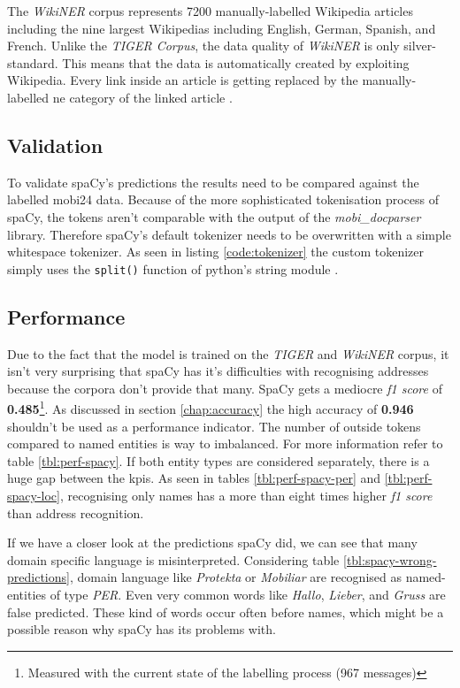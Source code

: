 The \emph{WikiNER} corpus represents 7200 manually-labelled Wikipedia articles including the nine largest Wikipedias including English, German, Spanish,
and French. Unlike the \emph{TIGER Corpus}, the data quality of \emph{WikiNER} is only silver-standard. This means that the data is automatically created
by exploiting Wikipedia. Every link inside an article is getting replaced by the manually-labelled \acrshort{ne} category of the linked article \cite{Nothman}.

\subsection{Validation}

To validate spaCy's predictions the results need to be compared against the labelled \gls{mobi24} data. Because of the more sophisticated tokenisation
process of spaCy, the tokens aren't comparable with the output of the \emph{mobi\_docparser} library. Therefore spaCy's default tokenizer needs to be
overwritten with a simple whitespace tokenizer. As seen in listing \ref{code:tokenizer} the custom tokenizer simply uses the \verb|split()| function of
python's string module \cite{spacy-tok}.

\subsection{Performance}

Due to the fact that the model is trained on the \emph{TIGER} and \emph{WikiNER} corpus, it isn't very surprising that spaCy has it's difficulties with
recognising addresses because the corpora don't provide that many. SpaCy gets a mediocre \emph{f1 score} of \textbf{0.485}\footnote{Measured with the
current state of the labelling process (967 messages)}. As discussed in section \ref{chap:accuracy} the high accuracy of \textbf{0.946} shouldn't be used
as a performance indicator. The number of outside tokens compared to named entities is way to imbalanced. For more information refer to table \ref{tbl:perf-spacy}.
If both entity types are considered separately, there is a huge gap between the \acrshort{kpi}s. As seen in tables \ref{tbl:perf-spacy-per} and
\ref{tbl:perf-spacy-loc}, recognising only names has a more than eight times higher \emph{f1 score} than address recognition.

If we have a closer look at the predictions spaCy did, we can see that many domain specific language is misinterpreted. Considering table
\ref{tbl:spacy-wrong-predictions}, domain language like \emph{\Gls{Protekta}} or \emph{Mobiliar} are recognised as named-entities of type \emph{PER}. Even
very common words like \emph{Hallo}, \emph{Lieber}, and \emph{Gruss} are false predicted. These kind of words occur often before names, which might be
a possible reason why spaCy has its problems with.

